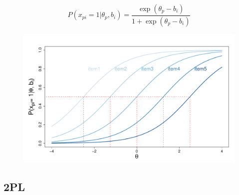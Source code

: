 \documentclass[aspectratio=149, compress]{beamer}
\begin{document}
\begin{frame}
$$P(x_{pi} = 1| \theta_p, b_i) = \dfrac{\exp(\theta_p - b_i)}{1 + \exp(\theta_p - b_i)}$$

\begin{figure}
	\centering
	\includegraphics[width=.8\linewidth]{img/icc-1pl}
\end{figure}
\end{frame}



\subsection*{2PL}
\end{document}
